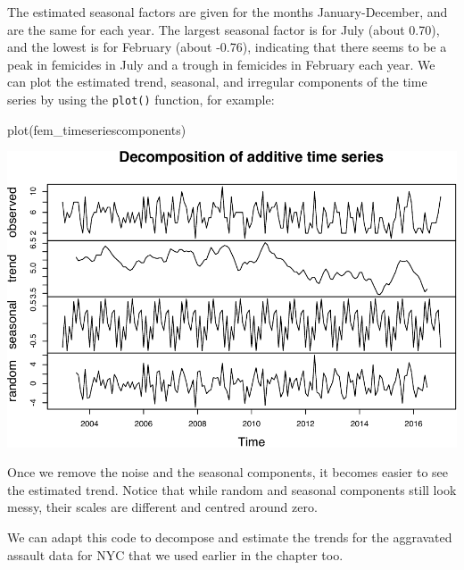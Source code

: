 \documentclass[
]{book}
\newenvironment{Shaded}{\begin{snugshade}}{\end{snugshade}}
\newcommand{\FunctionTok}[1]{\textcolor[rgb]{0.00,0.00,0.00}{#1}}
\newcommand{\NormalTok}[1]{#1}
\begin{document}
The estimated seasonal factors are given for the months January-December, and are the same for each year. The largest seasonal factor is for July (about 0.70), and the lowest is for February (about -0.76), indicating that there seems to be a peak in femicides in July and a trough in femicides in February each year. We can plot the estimated trend, seasonal, and irregular components of the time series by using the \texttt{plot()} function, for example:

\begin{Shaded}
\begin{Highlighting}[]
\FunctionTok{plot}\NormalTok{(fem\_timeseriescomponents)}
\end{Highlighting}
\end{Shaded}

\includegraphics{crime_mapping_files/figure-latex/unnamed-chunk-176-1.pdf}

Once we remove the noise and the seasonal components, it becomes easier to see the estimated trend. Notice that while random and seasonal components still look messy, their scales are different and centred around zero.

We can adapt this code to decompose and estimate the trends for the aggravated assault data for NYC that we used earlier in the chapter too.
\end{document}
